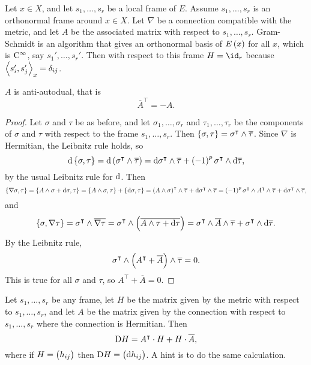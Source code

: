 Let $ x \in X $, and let $ s_1, \dots, s_r $ be a local frame of $ E $. Assume $ s_1, \dots, s_r $ is an orthonormal frame around $ x \in X $. Let $ \nabla $ be a connection compatible with the metric, and let $ A $ be the associated matrix with respect to $ s_1, \dots, s_r $. Gram-Schmidt is an algorithm that gives an orthonormal basis of $ E\br{x} $ for all $ x $, which is $ \mathrm{C}^\infty $, say $ s_1', \dots, s_r' $. Then with respect to this frame $ H = \id_r $ because $ \left\langle s_i', s_j' \right\rangle_x = \delta_{ij} $.

\begin{proposition}
$ A $ is anti-autodual, that is
$$ \overline{A}^\intercal = -A. $$
\end{proposition}

\begin{proof}
Let $ \sigma $ and $ \tau $ be as before, and let $ \sigma_1, \dots, \sigma_r $ and $ \tau_1, \dots, \tau_r $ be the components of $ \sigma $ and $ \tau $ with respect to the frame $ s_1, \dots, s_r $. Then $ \cbr{\sigma, \tau} = \sigma^\intercal \wedge \overline{\tau} $. Since $ \nabla $ is Hermitian, the Leibnitz rule holds, so
$$ \d\cbr{\sigma, \tau} = \d\br{\sigma^\intercal \wedge \overline{\tau}} = \d\sigma^\intercal \wedge \overline{\tau} + \br{-1}^p\sigma^\intercal \wedge \d\overline{\tau}, $$
by the usual Leibnitz rule for $ \mathrm{d} $. Then
$$ \cbr{\nabla\sigma, \tau} = \cbr{A \wedge \sigma + \d\sigma, \tau} = \cbr{A \wedge \sigma, \tau} + \cbr{\d\sigma, \tau} = \br{A \wedge \sigma}^\intercal \wedge \overline{\tau} + \d\sigma^\intercal \wedge \overline{\tau} = \br{-1}^p\sigma^\intercal \wedge A^\intercal \wedge \overline{\tau} + \d\sigma^\intercal \wedge \overline{\tau}, $$
and
$$ \cbr{\sigma, \nabla\tau} = \sigma^\intercal \wedge \overline{\nabla\tau} = \sigma^\intercal \wedge \br{\overline{A \wedge \tau + \d\tau}} = \sigma^\intercal \wedge \overline{A} \wedge \overline{\tau} + \sigma^\intercal \wedge \d\overline{\tau}. $$
By the Leibnitz rule,
$$ \sigma^\intercal \wedge \br{A^\intercal + \overline{A}} \wedge \overline{\tau} = 0. $$
This is true for all $ \sigma $ and $ \tau $, so $ A^\intercal + \overline{A} = 0 $.
\end{proof}

\begin{exercise*}
Let $ s_1, \dots, s_r $ be any frame, let $ H $ be the matrix given by the metric with respect to $ s_1, \dots, s_r $, and let $ A $ be the matrix given by the connection with respect to $ s_1, \dots, s_r $ where the connection is Hermitian. Then
$$ \mathrm{D} H = A^\intercal \cdot H + H \cdot \overline{A}, $$
where if $ H = \br{h_{ij}} $ then $ \D H = \br{\d h_{ij}} $. A hint is to do the same calculation.
\end{exercise*}

